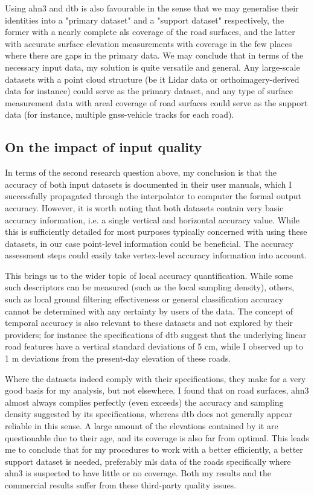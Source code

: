Using \ac{ahn3} and \ac{dtb} is also favourable in the sense that we may generalise their identities into a "primary dataset" and a "support dataset" respectively, the former with a nearly complete \ac{als} coverage of the road surfaces, and the latter with accurate surface elevation measurements with coverage in the few places where there are gaps in the primary data. We may conclude that in terms of the necessary input data, my solution is quite versatile and general. Any large-scale datasets with a point cloud structure (be it Lidar data or orthoimagery-derived data for instance) could serve as the primary dataset, and any type of surface measurement data with areal coverage of road surfaces could serve as the support data (for instance, multiple \ac{gnss}-vehicle tracks for each road).

\subsection{On the impact of input quality}
\label{sub:usefulnessquality}

In terms of the second research question above, my conclusion is that the accuracy of both input datasets is documented in their user manuals, which I successfully propagated through the interpolator to computer the formal output accuracy. However, it is worth noting that both datasets contain very basic accuracy information, i.e. a single vertical and horizontal accuracy value. While this is sufficiently detailed for most purposes typically concerned with using these datasets, in our case point-level information could be beneficial. The accuracy assessment steps could easily take vertex-level accuracy information into account.

This brings us to the wider topic of local accuracy quantification. While some such descriptors can be measured (such as the local sampling density), others, such as local ground filtering effectiveness or general classification accuracy cannot be determined with any certainty by users of the data. The concept of temporal accuracy is also relevant to these datasets and not explored by their providers; for instance the specifications of \ac{dtb} suggest that the underlying linear road features have a vertical standard deviations of 5 cm, while I observed up to 1 m deviations from the present-day elevation of these roads.

Where the datasets indeed comply with their specifications, they make for a very good basis for my analysis, but not elsewhere. I found that on road surfaces, \ac{ahn3} almost always complies perfectly (even exceeds) the accuracy and sampling density suggested by its specifications, whereas \ac{dtb} does not generally appear reliable in this sense. A large amount of the elevations contained by it are questionable due to their age, and its coverage is also far from optimal. This leads me to conclude that for my procedures to work with a better efficiently, a better support dataset is needed, preferably \ac{mls} data of the roads specifically where \ac{ahn3} is suspected to have little or no coverage. Both my results and the commercial results suffer from these third-party quality issues.

